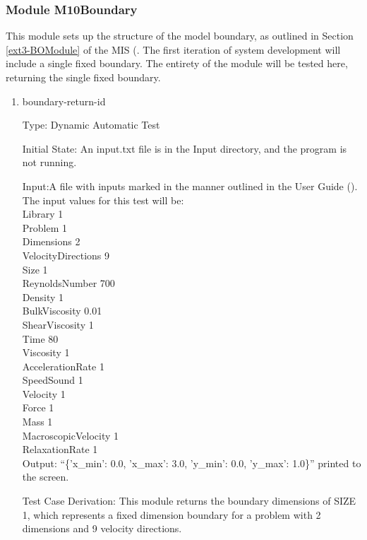 \documentclass[12pt, titlepage]{article}
\newcounter{uvtestcounter} %
\begin{document}
\subsubsection{Module M10Boundary}

This module sets up the structure of the model boundary, as outlined in Section \ref{ext3-BOModule} of the MIS (\citet{LBM_MIS_PM}. The first iteration of system development will include a single fixed boundary. The entirety of the module will be tested here, returning the single fixed boundary.

\begin{enumerate}
	
	\item{boundary-return-id\theuvtestcounter\\}
	
	Type: Dynamic Automatic Test
	
Initial State: An input.txt file is in the Input directory, and the program is not running.

Input:A file with inputs marked in the manner outlined in the
User Guide (\citet{LBM_UserGuide_PM}).\\The input values for this test will
be:\\

Library 1\\
Problem 1\\
Dimensions 2\\
VelocityDirections 9\\
Size 1\\
ReynoldsNumber 700\\
Density 1\\
BulkViscosity 0.01\\
ShearViscosity 1\\
Time 80\\
Viscosity 1\\
AccelerationRate 1\\
SpeedSound 1\\
Velocity 1\\
Force 1\\
Mass 1\\
MacroscopicVelocity 1\\
RelaxationRate 1\\
	
	Output: ``\{'x\_min': 0.0, 'x\_max': 3.0, 'y\_min': 0.0, 'y\_max': 1.0\}'' printed to the screen.
	
	Test Case Derivation: This module returns the boundary dimensions of SIZE 1, which represents a fixed dimension boundary for a problem with 2 dimensions and 9 velocity directions.
	

\end{enumerate}
\end{document}
